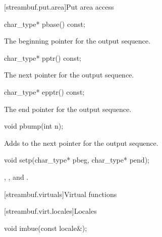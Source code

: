 [streambuf.put.area]{Put area access}

%
\begin{itemdecl}
char_type* pbase() const;
\end{itemdecl}

\begin{itemdescr}
\pnum
\returns
The beginning pointer for the output sequence.
\end{itemdescr}

%
\begin{itemdecl}
char_type* pptr() const;
\end{itemdecl}

\begin{itemdescr}
\pnum
\returns
The next pointer for the output sequence.
\end{itemdescr}

%
\begin{itemdecl}
char_type* epptr() const;
\end{itemdecl}

\begin{itemdescr}
\pnum
\returns
The end pointer for the output sequence.
\end{itemdescr}

%
\begin{itemdecl}
void pbump(int n);
\end{itemdecl}

\begin{itemdescr}
\pnum
\effects
Adds  to the next pointer for the output sequence.
\end{itemdescr}

%
\begin{itemdecl}
void setp(char_type* pbeg, char_type* pend);
\end{itemdecl}

\begin{itemdescr}
\pnum
\ensures
{},
,
and
.
\end{itemdescr}

[streambuf.virtuals]{Virtual functions}

[streambuf.virt.locales]{Locales}

%
\begin{itemdecl}
void imbue(const locale&);
\end{itemdecl}

